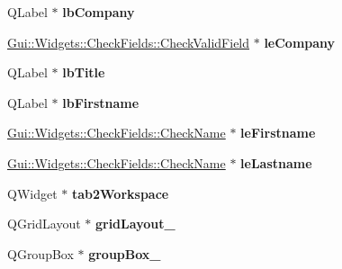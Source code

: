 \begin{DoxyCompactItemize}
\item 
\hypertarget{classUi__UserDataDialog_a53ff5e8b36e6dd1ab0e420960aa01edc}{Q\-Label $\ast$ {\bfseries lb\-Company}}\label{classUi__UserDataDialog_a53ff5e8b36e6dd1ab0e420960aa01edc}

\item 
\hypertarget{classUi__UserDataDialog_a5a7582b88f51febecc47c4260dda1dd5}{\hyperlink{classGui_1_1Widgets_1_1CheckFields_1_1CheckValidField}{Gui\-::\-Widgets\-::\-Check\-Fields\-::\-Check\-Valid\-Field} $\ast$ {\bfseries le\-Company}}\label{classUi__UserDataDialog_a5a7582b88f51febecc47c4260dda1dd5}

\item 
\hypertarget{classUi__UserDataDialog_a8887845403e2e23f1dea0b14972f9166}{Q\-Label $\ast$ {\bfseries lb\-Title}}\label{classUi__UserDataDialog_a8887845403e2e23f1dea0b14972f9166}

\item 
\hypertarget{classUi__UserDataDialog_a223578328b8c149c7743d9c5e7bb11c4}{Q\-Label $\ast$ {\bfseries lb\-Firstname}}\label{classUi__UserDataDialog_a223578328b8c149c7743d9c5e7bb11c4}

\item 
\hypertarget{classUi__UserDataDialog_aa3245156aa6ef8af214e4d9610bdca9b}{\hyperlink{classGui_1_1Widgets_1_1CheckFields_1_1CheckName}{Gui\-::\-Widgets\-::\-Check\-Fields\-::\-Check\-Name} $\ast$ {\bfseries le\-Firstname}}\label{classUi__UserDataDialog_aa3245156aa6ef8af214e4d9610bdca9b}

\item 
\hypertarget{classUi__UserDataDialog_a6e4debaaa9dbbb7012d1ba674f22e386}{\hyperlink{classGui_1_1Widgets_1_1CheckFields_1_1CheckName}{Gui\-::\-Widgets\-::\-Check\-Fields\-::\-Check\-Name} $\ast$ {\bfseries le\-Lastname}}\label{classUi__UserDataDialog_a6e4debaaa9dbbb7012d1ba674f22e386}

\item 
\hypertarget{classUi__UserDataDialog_a76fdfbb21e5b1caf571378a0b43524c0}{Q\-Widget $\ast$ {\bfseries tab2\-Workspace}}\label{classUi__UserDataDialog_a76fdfbb21e5b1caf571378a0b43524c0}

\item 
\hypertarget{classUi__UserDataDialog_ae7013c16976febb13471475c7b40456e}{Q\-Grid\-Layout $\ast$ {\bfseries grid\-Layout\-\_}}\label{classUi__UserDataDialog_ae7013c16976febb13471475c7b40456e}

\item 
\hypertarget{classUi__UserDataDialog_aa05e54d3c2b9f84d994c4ff8c2cd590c}{Q\-Group\-Box $\ast$ {\bfseries group\-Box\-\_}}\label{classUi__UserDataDialog_aa05e54d3c2b9f84d994c4ff8c2cd590c}


\end{DoxyCompactItemize}
